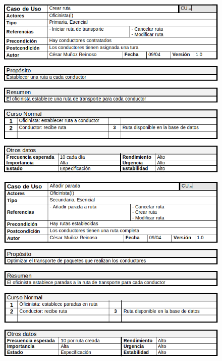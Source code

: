 \begin{figure}[H]
	\centering
	\includegraphics[width=16cm]{7}
\end{figure}
\begin{figure}[H]
	\centering
	\includegraphics[width=16cm]{8}
\end{figure}
